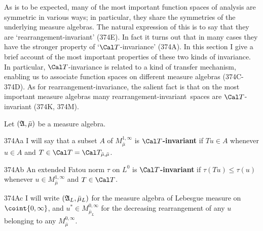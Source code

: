 
\def\chaptername{Linear operators between function spaces}
\def\sectionname{Rearrangement-invariant spaces}

\def\ri{rearrangement{\vthsp}-{\vthsp}invariant}


As is to be expected, many of the most important function spaces of
analysis are symmetric in various ways;  in particular, they share the
symmetries of the underlying measure algebras.   The natural expression
of this is to say that they are `\ri' (374E).
In fact it turns out that in many cases they have the stronger property
of `$\Cal T$-invariance' (374A).   In this section I give a brief
account of the most important properties of these two kinds of
invariance.   In particular, $\Cal T$-invariance is related to a kind of
transfer mechanism, enabling us to associate function spaces on
different measure algebras (374C-374D).   As for
rearrangement-{\vthsp}invariance, the salient fact is that on the most
important measure algebras many \ri\ spaces are
$\Cal T$-invariant (374K, 374M).

 Let
$(\frak A,\bar\mu)$ be a measure algebra.   %

\spheader 374Aa I will say that a subset $A$ of
$M^{1,\infty}_{\bar\mu}$ is
{\bf $\Cal T$-invariant} if $Tu\in A$ whenever $u\in A$ and
$T\in\Cal T=\Cal T_{\bar\mu,\bar\mu}$.

\spheader 374Ab An extended Fatou norm $\tau$ on $L^0$
is {\bf $\Cal T$-invariant} if
$\tau(Tu)\le\tau(u)$ whenever $u\in M^{1,\infty}_{\bar\mu}$ and
$T\in\Cal T$.


\spheader 374Ac  I will write
$(\frak A_L,\bar\mu_L)$ for the measure algebra of Lebesgue measure on
$\coint{0,\infty}$, and $u^*\in M^{0,\infty}_{\bar\mu_L}$ for
the decreasing rearrangement of any $u$ belonging to any
$M^{0,\infty}_{\bar\mu}$.

